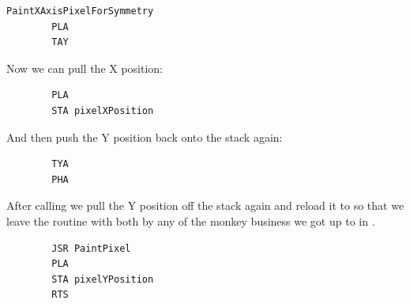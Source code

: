 \begin{lstlisting}
PaintXAxisPixelForSymmetry    
        PLA 
        TAY 
\end{lstlisting}

Now we can pull the X position:
\begin{lstlisting}
        PLA 
        STA pixelXPosition
\end{lstlisting}

And then push the Y position back onto the stack again:
\begin{lstlisting}
        TYA 
        PHA 
\end{lstlisting}

After calling  we pull the Y position off the stack again and reload it to  so that we leave
the routine with both  by any of the monkey business we got up to in .

\begin{lstlisting}
        JSR PaintPixel
        PLA 
        STA pixelYPosition
        RTS 
\end{lstlisting}

